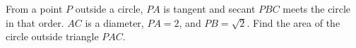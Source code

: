 From a point $P$ outside a circle, $PA$ is tangent and secant $PBC$ meets the circle in that order. $AC$ is a diameter, $PA=2$, and $PB=\sqrt2$. Find the area of the circle outside triangle $PAC$.
